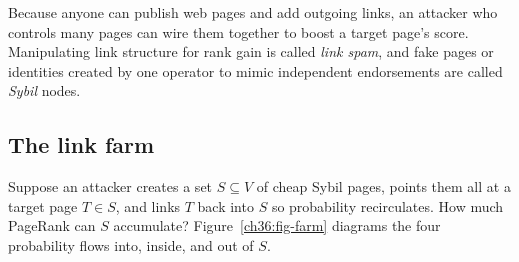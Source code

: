Because anyone can publish web pages and add outgoing links, an attacker who controls many pages can wire them together to boost a target page's score. Manipulating link structure for rank gain is called \emph{link spam}, and fake pages or identities created by one operator to mimic independent endorsements are called \emph{Sybil} nodes.

\subsection{The link farm}

Suppose an attacker creates a set $S \subseteq V$ of cheap Sybil pages, points them all at a target page $T \in S$, and links $T$ back into $S$ so probability recirculates. How much PageRank can $S$ accumulate? Figure~\ref{ch36:fig-farm} diagrams the four probability flows into, inside, and out of $S$.

